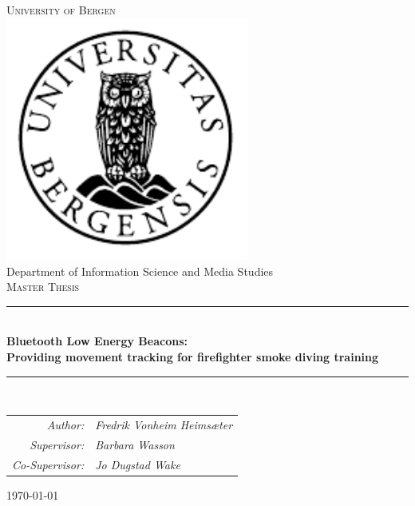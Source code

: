 \documentclass[../Main/thesis.tex]{subfiles}
\begin{document}

\newcommand{\HRule}{\rule{\linewidth}{0.5mm}}

\begin{titlepage}
\begin{center}
\textsc{\Huge University of Bergen}\\[0.4cm]
\includegraphics[width=8cm]{../fig/uib} \\[0.5cm]

\large Department of Information Science and Media Studies\\[0.7cm]
\textsc{\huge Master Thesis}\\[0.4cm]
\HRule \\[0.4cm]
{ \huge \bfseries Bluetooth Low Energy Beacons: \\Providing movement tracking for firefighter smoke diving training}\\[0.5cm]
\HRule \\[1.0cm]

\renewcommand{\arraystretch}{1}
\begin{tabular}{rl}
\textit{Author:}        & \textit{Fredrik Vonheim Heimsæter} \\
\textit{Supervisor:}    & \textit{Barbara Wasson}            \\
\textit{Co-Supervisor:} & \textit{Jo Dugstad Wake}
\end{tabular}

\renewcommand{\arraystretch}{1.5}
\end{center}
\vfill
\begin{center}
{\large \today}
\end{center}
\end{titlepage}
\end{document}
